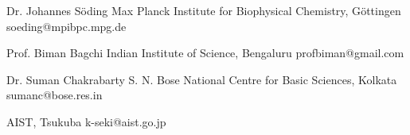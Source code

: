 


\begin{cvreferees}


\cvreferee
{Dr. Johannes S{\"o}ding} %
{Max Planck Institute for Biophysical Chemistry, G{\"o}ttingen} %
{soeding@mpibpc.mpg.de} %

\cvreferee
{Prof. Biman Bagchi}
{Indian Institute of Science, Bengaluru}
{profbiman@gmail.com}

\cvreferee
{Dr. Suman Chakrabarty}
{S. N. Bose National Centre for Basic Sciences, Kolkata}
{sumanc@bose.res.in}

{AIST, Tsukuba}
{k-seki@aist.go.jp}


\end{cvreferees}
